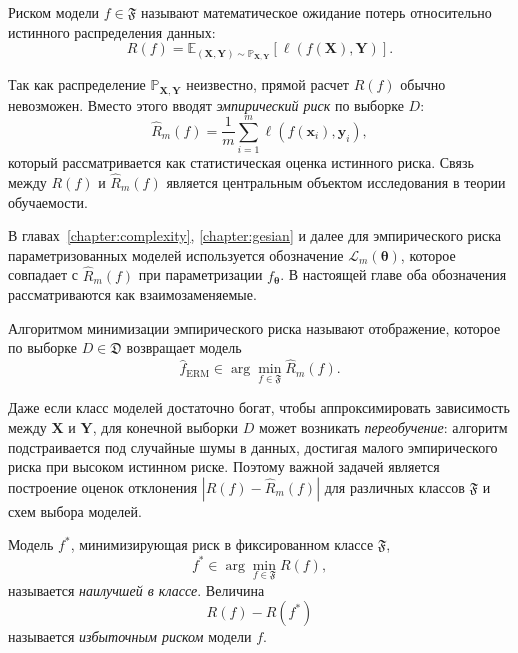 \begin{definition}
    Риском модели $f \in \mathfrak{F}$ называют математическое ожидание потерь относительно истинного распределения данных:
    \[
        R(f) = \mathbb{E}_{(\mathbf{X},\mathbf{Y}) \sim \mathbb{P}_{\mathbf{X},\mathbf{Y}}}\left[\ell(f(\mathbf{X}), \mathbf{Y})\right].
    \]
\end{definition}

Так как распределение $\mathbb{P}_{\mathbf{X},\mathbf{Y}}$ неизвестно, прямой расчет $R(f)$ обычно невозможен. Вместо этого вводят \textit{эмпирический риск} по выборке $D$:
\[
    \hat{R}_m(f) = \frac{1}{m} \sum_{i=1}^{m} \ell(f(\mathbf{x}_i), \mathbf{y}_i),
\]
который рассматривается как статистическая оценка истинного риска. Связь между $R(f)$ и $\hat{R}_m(f)$ является центральным объектом исследования в теории обучаемости.

\begin{remark}
    В главах~\ref{chapter:complexity}, \ref{chapter:gesian} и далее для эмпирического риска параметризованных моделей используется обозначение $\mathcal{L}_m(\boldsymbol{\theta})$, которое совпадает с $\hat{R}_m(f)$ при параметризации $f_{\boldsymbol{\theta}}$. В настоящей главе оба обозначения рассматриваются как взаимозаменяемые.
\end{remark}

\begin{definition}
    Алгоритмом минимизации эмпирического риска называют отображение, которое по выборке $D \in \mathfrak{D}$ возвращает модель
    \[
        \hat{f}_{\mathrm{ERM}} \in \arg\min_{f \in \mathfrak{F}} \hat{R}_m(f).
    \]
\end{definition}

Даже если класс моделей достаточно богат, чтобы аппроксимировать зависимость между $\mathbf{X}$ и $\mathbf{Y}$, для конечной выборки $D$ может возникать \textit{переобучение}: алгоритм подстраивается под случайные шумы в данных, достигая малого эмпирического риска при высоком истинном риске. Поэтому важной задачей является построение оценок отклонения $|R(f) - \hat{R}_m(f)|$ для различных классов $\mathfrak{F}$ и схем выбора моделей.

\begin{definition}
    Модель $f^{*}$, минимизирующая риск в фиксированном классе $\mathfrak{F}$,
    \[
        f^{*} \in \arg\min_{f \in \mathfrak{F}} R(f),
    \]
    называется \textit{наилучшей в классе}. Величина
    \[
        R(f) - R(f^{*})
    \]
    называется \textit{избыточным риском} модели $f$.
\end{definition}

